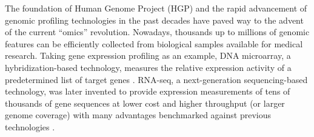 The foundation of Human Genome Project (HGP) and the rapid advancement of genomic profiling technologies in the past decades have paved way to the advent of the current ``omics'' revolution. Nowadays, thousands up to millions of genomic features can be efficiently collected from biological samples available for medical research. Taking gene expression profiling as an example, DNA microarray, a hybridization-based technology, measures the relative expression activity of a predetermined list of target genes \cite{Lockhart1996Expression}. RNA-seq, a next-generation sequencing-based technology, was later invented to provide expression measurements of tens of thousands of gene sequences at lower cost and higher throughput (or larger genome coverage) with many advantages benchmarked against previous technologies \cite{Wang2009RNA}.


